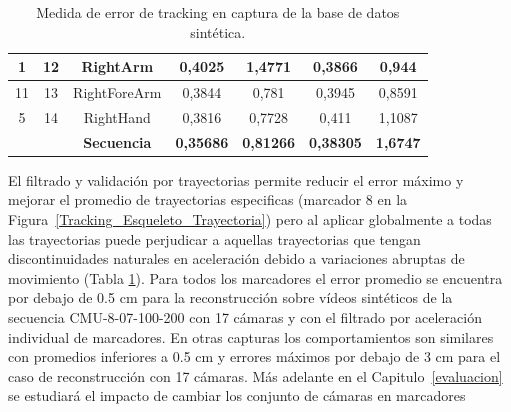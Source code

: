 \begin{table}[ht!]
{\begin{tabular}{|c|c|c|c|c|c|c|}
1        & 12        & RightArm           & 0,4025                                                       & 1,4771                                                       & 0,3866                                                                  & 0,944                                                                   \\ \hline
11       & 13        & RightForeArm       & 0,3844                                                       & 0,781                                                        & 0,3945                                                                  & 0,8591                                                                  \\ \hline
5        & 14        & RightHand          & 0,3816                                                       & 0,7728                                                       & 0,411                                                                   & 1,1087                                                                  \\ \hline
         &           & \textbf{Secuencia} & \textbf{0,35686}                                             & \textbf{0,81266}                                             & \textbf{0,38305}                                                        & \textbf{1,6747}                                                         \\ \hline
\end{tabular}
}
\caption{Medida de error de tracking en captura de la base de datos sintética.}
\label{tablaerrortrack}
\end{table}



El filtrado y validación por trayectorias permite reducir el error máximo y mejorar el promedio de trayectorias especificas (marcador 8 en la Figura~\ref{Tracking_Esqueleto_Trayectoria}) pero al aplicar globalmente a todas las trayectorias puede perjudicar a aquellas trayectorias que tengan discontinuidades naturales en aceleración debido a variaciones abruptas de movimiento (Tabla \ref{tablaerrortrack}). Para todos los marcadores el error promedio se encuentra por debajo de 0.5 cm para la reconstrucción sobre vídeos sintéticos de la secuencia CMU-8-07-100-200 con 17 cámaras y con el filtrado por aceleración individual de marcadores. En otras capturas los comportamientos son similares con promedios inferiores a 0.5 cm y errores máximos por debajo de 3 cm para el caso de reconstrucción con 17 cámaras. Más adelante en el Capitulo~\ref{evaluacion} se estudiará el impacto de cambiar los conjunto de cámaras en marcadores   


